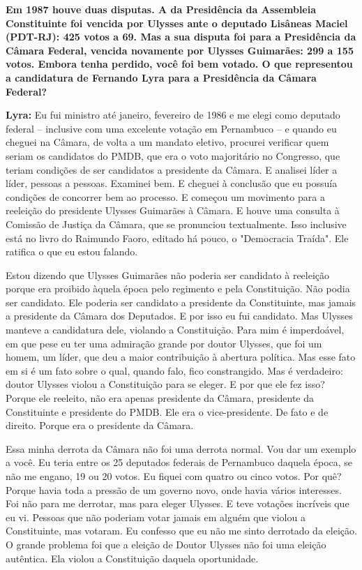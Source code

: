 \textbf{Em 1987 houve duas disputas. A da Presidência da Assembleia
Constituinte foi vencida por Ulysses ante o deputado Lisâneas Maciel
(PDT-RJ): 425 votos a 69. Mas a sua disputa foi para a Presidência da
Câmara Federal, vencida novamente por Ulysses Guimarães: 299 a 155
votos. Embora tenha perdido, você foi bem votado. O que representou a
candidatura de Fernando Lyra para a Presidência da Câmara Federal?}

\textbf{Lyra:} Eu fui ministro até janeiro, fevereiro de 1986 e me elegi
como deputado federal -- inclusive com uma excelente votação em
Pernambuco -- e quando eu cheguei na Câmara, de volta a um mandato
eletivo, procurei verificar quem seriam os candidatos do PMDB, que era o
voto majoritário no Congresso, que teriam condições de ser candidatos a
presidente da Câmara. E analisei líder a líder, pessoas a pessoas.
Examinei bem. E cheguei à conclusão que eu possuía condições de
concorrer bem ao processo. E começou um movimento para a reeleição do
presidente Ulysses Guimarães à Câmara. E houve uma consulta à Comissão
de Justiça da Câmara, que se pronunciou textualmente. Isso inclusive
está no livro do Raimundo Faoro, editado há pouco, o "Democracia
Traída". Ele ratifica o que eu estou falando.

Estou dizendo que Ulysses Guimarães não poderia ser candidato à
reeleição porque era proibido àquela época pelo regimento e pela
Constituição. Não podia ser candidato. Ele poderia ser candidato a
presidente da Constituinte, mas jamais a presidente da Câmara dos
Deputados. E por isso eu fui candidato. Mas Ulysses manteve a
candidatura dele, violando a Constituição. Para mim é imperdoável, em
que pese eu ter uma admiração grande por doutor Ulysses, que foi um
homem, um líder, que deu a maior contribuição à abertura política. Mas
esse fato em si é um fato sobre o qual, quando falo, fico constrangido.
Mas é verdadeiro: doutor Ulysses violou a Constituição para se eleger. E
por que ele fez isso? Porque ele reeleito, não era apenas presidente da
Câmara, presidente da Constituinte e presidente do PMDB. Ele era o
vice-presidente. De fato e de direito. Porque era o presidente da
Câmara.

Essa minha derrota da Câmara não foi uma derrota normal. Vou dar um
exemplo a você. Eu teria entre os 25 deputados federais de Pernambuco
daquela época, se não me engano, 19 ou 20 votos. Eu fiquei com quatro ou
cinco votos. Por quê? Porque havia toda a pressão de um governo novo,
onde havia vários interesses. Foi não para me derrotar, mas para eleger
Ulysses. E teve votações incríveis que eu vi. Pessoas que não poderiam
votar jamais em alguém que violou a Constituinte, mas votaram. Eu
confesso que eu não me sinto derrotado da eleição. O grande problema foi
que a eleição de Doutor Ulysses não foi uma eleição autêntica. Ela
violou a Constituição daquela oportunidade.

